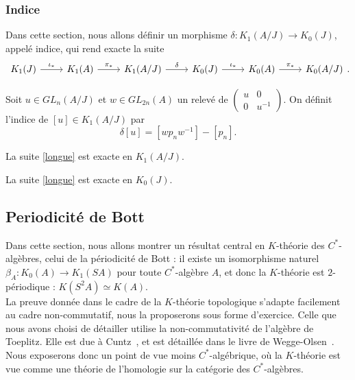 \subsubsection{Indice}
Dans cette section, nous allons définir un morphisme $\delta : K_1(A/J)\rightarrow K_0(J)$, appelé indice, qui rend exacte la suite
\begin{equation}\begin{tikzcd} K_1(J) \arrow{r}{\iota_*} & K_1(A)\arrow{r}{\pi_*} & K_1(A/J)\arrow{r}{\delta} 
& K_0(J) \arrow{r}{\iota_*} & K_0(A)\arrow{r}{\pi_*} & K_0(A/J)
\end{tikzcd}.\label{longue}\end{equation}
\begin{definition}
Soit $u\in GL_n(A/J)$ et $w\in GL_{2n}(A)$ un relevé de $\begin{pmatrix}u & 0 \\ 0 & u^{-1}\end{pmatrix}$. On définit l'indice de $[u]\in K_1(A/J)$ par \[\delta [u]=[wp_n w^{-1}]-[p_n].\]
\end{definition}

\begin{prop}
La suite \ref{longue} est exacte en $K_1(A/J)$.
\end{prop}

\begin{prop}
La suite \ref{longue} est exacte en $K_0(J)$.
\end{prop}

\subsection{Periodicité de Bott}

Dans cette section, nous allons montrer un résultat central en $K$-théorie des $C^*$-algèbres, celui de la périodicité de Bott : il existe un isomorphisme naturel $\beta_A : K_0 (A) \rightarrow K_1(SA)$ pour toute $C^*$-algèbre $A$, et donc la $K$-théorie est $2$-périodique : $K(S^2 A )\simeq K(A)$.\\

La preuve donnée dans le cadre de la $K$-théorie topologique s'adapte facilement au cadre non-commutatif, nous la proposerons sous forme d'exercice. Celle que nous avons choisi de détailler utilise la non-commutativité de l'algèbre de Toeplitz. Elle est due à Cuntz~\cite{Cuntz}, et est détaillée dans le livre de Wegge-Olsen~\cite{WeggeOlsen}. Nous exposerons donc un point de vue moins $C^*$-algébrique, où la $K$-théorie est vue comme une théorie de l'homologie sur la catégorie des $C^*$-algèbres.\\


